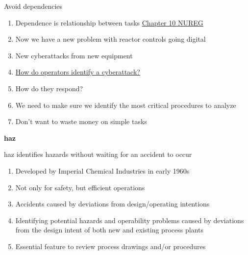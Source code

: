 \documentclass[aspectratio=1610,pdftex,dvipsnames,compress,xcolor={dvipsnames}]{beamer}
\newcommand{\acs}{\acrshort} %
\begin{document}
\addtocounter{framenumber}{-1}
\begin{frame}{Avoid dependencies}
    \begin{enumerate}[series=outerlist,topsep=0pt,itemsep=15pt,leftmargin=*,label=(\arabic*)]
        \item[]Dependence is relationship between tasks \href{https://uidaho.pressbooks.pub/riskassessment/chapter/human-reliability-analysis/}{Chapter 10 NUREG}
        \item[]Now we have a new problem with reactor controls going digital
        \item[]New cyberattacks from new equipment  
        \item[]\href{https://www.sciencedirect.com/science/article/abs/pii/S0149197023001774}{How do operators identify a cyberattack?}
        \item[]How do they respond?  
        \item[]We need to make sure we identify the most critical procedures to analyze
        \item[]Don't want to waste money on simple tasks
    \end{enumerate}
\end{frame}


\begin{frame}[plain]{}
    \centering\LARGE\textbf{\acs{haz}}
\end{frame}


\addtocounter{framenumber}{-1}
\begin{frame}{\acs{haz} identifies hazards without waiting for an accident to occur}
    \begin{enumerate}[series=outerlist,topsep=0pt,itemsep=21pt,leftmargin=*,label=(\arabic*)]
        \item[]Developed by Imperial Chemical Industries in early 1960s
        \item[]Not only for safety, but efficient operations
        \item[]Accidents caused by deviations from design/operating intentions
        \item[]Identifying potential hazards and operability problems caused by deviations from the design intent of both new and existing process plants
        \item[]Essential feature to review process drawings and/or procedures
    \end{enumerate}
\end{frame}
\end{document}
